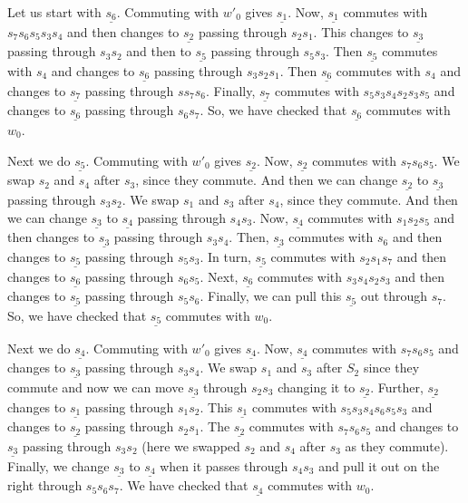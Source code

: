 \documentclass[a4paper]{amsart}
\begin{document}
Let us start with $\underline{s_{6}}$. Commuting with 
$w'_0$ gives $\underline{s_{1}}$. Now, $\underline{s_{1}}$
commutes with $s_7 s_6 s_5 s_3 s_4$ and then changes to
$\underline{s_{2}}$ passing through $s_2 s_1$. This
changes to $\underline{s_{3}}$ passing through $s_3 s_2$
and then to $\underline{s_{5}}$ passing through $s_5 s_3$.
Then $\underline{s_{5}}$ commutes with $s_4$ and 
changes to $\underline{s_{6}}$ passing through $s_3 s_2 s_1$.
Then $\underline{s_{6}}$ commutes with $s_4$ and 
changes to $\underline{s_{7}}$ passing through $ss_7 s_6$.
Finally, $\underline{s_{7}}$ commutes with 
$s_5 s_3 s_4 s_2s_3 s_5$ and 
changes to $\underline{s_{6}}$ passing through $s_6 s_7$.
So, we have checked that $\underline{s_{6}}$ commutes with $w_0$.

Next we do $\underline{s_{5}}$. Commuting with 
$w'_0$ gives $\underline{s_{2}}$. Now, $\underline{s_{2}}$
commutes with $s_7 s_6 s_5$. We swap $s_2$ and $s_4$
after $s_3$, since they commute. And then we can change 
$\underline{s_{2}}$ to $\underline{s_{3}}$ passing through $s_3 s_2$.
We swap $s_1$ and $s_3$
after $s_4$, since they commute. And then we can change 
$\underline{s_{3}}$ to $\underline{s_{4}}$ passing through $s_4 s_3$.
Now, $\underline{s_{4}}$ commutes with $s_1 s_2  s_5$ and then 
changes to $\underline{s_{3}}$ passing through $s_3 s_4$.
Then, $\underline{s_{3}}$ commutes with $s_6$ and then 
changes to $\underline{s_{5}}$ passing through $s_5 s_3$.
In turn, $\underline{s_{5}}$ commutes with $s_2 s_1 s_7 $ and then 
changes to $\underline{s_{6}}$ passing through $s_6 s_5$.
Next, $\underline{s_{6}}$ commutes with $s_3 s_4 s_2 s_3$ and then 
changes to $\underline{s_{5}}$ passing through $s_5 s_6$.
Finally, we can pull this $\underline{s_{5}}$ out through $s_7$.
So, we have checked that $\underline{s_{5}}$ commutes with $w_0$.

Next we do $\underline{s_{4}}$. Commuting with 
$w'_0$ gives $\underline{s_{4}}$. Now, $\underline{s_{4}}$
commutes with $s_7 s_6 s_5$ and changes to  $\underline{s_{3}}$
passing through $s_3 s_4$. We swap $s_1$ and $s_3$
after $S_2$ since they commute and now we can move
$\underline{s_{3}}$ through $s_2 s_3$ changing it to $\underline{s_{2}}$.
Further, $\underline{s_{2}}$ changes to $\underline{s_{1}}$
passing through $s_1s_2$. This $\underline{s_{1}}$
commutes with $s_5 s_3 s_4 s_6 s_5 s_3$ and changes to $\underline{s_{2}}$
passing through $s_2s_1$. The $\underline{s_{2}}$
commutes with $s_7 s_6 s_5$ and changes to $\underline{s_{3}}$
passing through $s_3s_2$ (here we swapped $s_2$ and $s_4$
after $s_3$ as they commute). Finally, we change 
$\underline{s_{3}}$ to $\underline{s_{4}}$ when it passes
through $s_4 s_3$ and pull it out on the right through
$s_5 s_6 s_7$. We have checked that 
$\underline{s_{4}}$ commutes with $w_0$.
\end{document}
